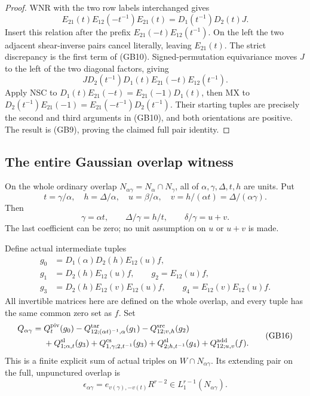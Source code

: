 \begin{proof}
WNR with the two row labels interchanged gives
\[
 E_{21}(t)E_{12}(-t^{-1})E_{21}(t)
                     =D_1(t^{-1})D_2(t)J.
 \tag{GB11}
\]
Insert this relation after the prefix
$E_{21}(-t)E_{12}(t^{-1})$.  On the left the two adjacent
shear-inverse pairs cancel literally, leaving $E_{21}(t)$.
The strict discrepancy is the first term of (GB10).
Signed-permutation equivariance moves $J$ to the left of the
two diagonal factors, giving
\[
 J D_2(t^{-1})D_1(t)E_{21}(-t)E_{12}(t^{-1}).
 \tag{GB12}
\]
Apply NSC to
$D_1(t)E_{21}(-t)=E_{21}(-1)D_1(t)$, then MX to
$D_2(t^{-1})E_{21}(-1)=E_{21}(-t^{-1})D_2(t^{-1})$.
Their starting tuples are precisely the second and third
arguments in (GB10), and both orientations are positive.
The result is (GB9), proving the claimed full pair identity.
\end{proof}

\subsection{The entire Gaussian overlap witness}

On the whole ordinary overlap $N_{\alpha\gamma}=N_\alpha\cap
N_\gamma$, all of $\alpha,\gamma,\Delta,t,h$ are units.  Put
\[
 t=\gamma/\alpha,\quad h=\Delta/\alpha,\quad
 u=\beta/\alpha,\quad v=h/(\alpha t)=\Delta/(\alpha\gamma).
 \tag{GB13}
\]
Then
\[
 \gamma=\alpha t,\qquad \Delta/\gamma=h/t,
                   \qquad \delta/\gamma=u+v.
 \tag{GB14}
\]
The last coefficient can be zero; no unit assumption on $u$ or
$u+v$ is made.

Define actual intermediate tuples
\[
 \begin{split}
 g_0&=D_1(\alpha)D_2(h)E_{12}(u)f,\\
 g_1&=D_2(h)E_{12}(u)f,\qquad g_2=E_{12}(u)f,\\
 g_3&=D_2(h)E_{12}(v)E_{12}(u)f,\qquad
 g_4=E_{12}(v)E_{12}(u)f.
 \end{split}
 \tag{GB15}
\]
All invertible matrices here are defined on the whole overlap,
and every tuple has the same common zero set as $f$.  Set
\[
 \begin{split}
 Q_{\alpha\gamma}={}&Q^{\rm piv}_t(g_0)
 -Q^{\rm tar}_{12;(\alpha t)^{-1},\alpha}(g_1)
 -Q^{\rm src}_{12;v,h}(g_2)\\
 &+Q^{\rm sl}_{1;\alpha,t}(g_3)
 +Q^{\rm cs}_{1,\gamma;2,t^{-1}}(g_3)
 +Q^{\rm sl}_{2;h,t^{-1}}(g_4)
 +Q^{\rm add}_{12;u,v}(f).
 \end{split}
 \tag{GB16}
\]
This is a finite explicit sum of actual triples on
$W\cap N_{\alpha\gamma}$.  Its extending pair on the full,
unpunctured overlap is
\[
 \epsilon_{\alpha\gamma}=e_{v(\gamma),-v(t)}R^{r-2}
                              \in L_1^{r-1}(N_{\alpha\gamma}).
 \tag{GB17}
\]

